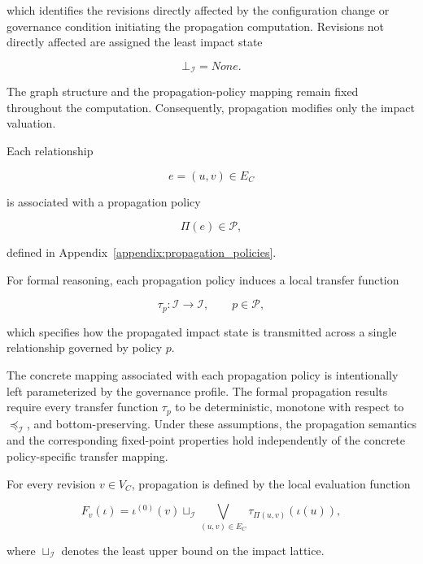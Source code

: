 \documentclass[10pt]{article}
\begin{document}
which identifies the revisions directly affected by the configuration change or
governance condition initiating the propagation computation. Revisions not
directly affected are assigned the least impact state

\[
\bot_{\mathcal I}=None.
\]

The graph structure and the propagation-policy mapping remain fixed throughout the computation. Consequently, propagation modifies only the impact valuation.


Each relationship

\[
e=(u,v)\in E_C
\]

is associated with a propagation policy

\[
\Pi(e)\in\mathcal P,
\]

defined in Appendix~\ref{appendix:propagation_policies}.

For formal reasoning, each propagation policy induces a local transfer function

\begin{equation}
	\tau_p :
	\mathcal I
	\rightarrow
	\mathcal I,
	\qquad
	p\in\mathcal P,
	\label{eq:transfer_function}
\end{equation}

which specifies how the propagated impact state is transmitted across a single relationship governed by policy $p$.

The concrete mapping associated with each propagation policy is intentionally left parameterized by the governance profile. The formal propagation results require every transfer function $\tau_p$ to be deterministic, monotone with respect to $\preceq_{\mathcal I}$, and bottom-preserving. Under these assumptions, the propagation semantics and the corresponding fixed-point properties hold independently of the concrete policy-specific transfer mapping.


For every revision $v\in V_C$, propagation is defined by the local evaluation function

\begin{equation}
	\label{eq:local_transfer}
	F_v(\iota)
	=
	\iota^{(0)}(v)
	\sqcup_{\mathcal I}
	\bigvee_{(u,v)\in E_C}
	\tau_{\Pi(u,v)}
	\!\left(
	\iota(u)
	\right),
\end{equation}

where $\sqcup_{\mathcal I}$ denotes the least upper bound on the impact lattice.
\end{document}
